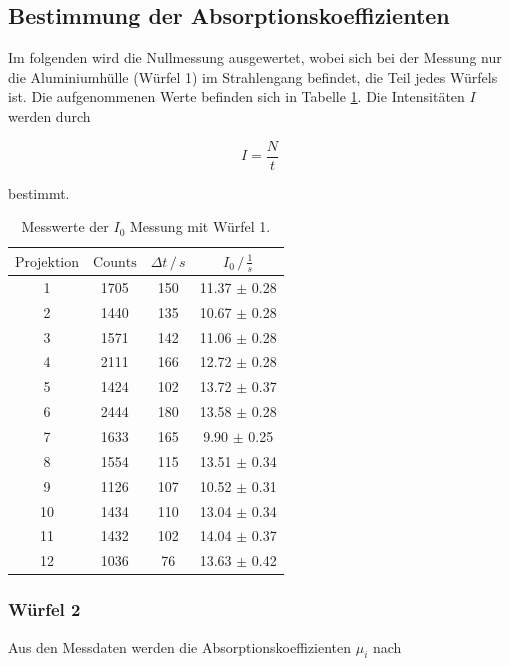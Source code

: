 \newpage
\subsection{Bestimmung der Absorptionskoeffizienten}
\noindent
Im folgenden wird die Nullmessung ausgewertet, wobei sich bei der Messung nur die Aluminiumhülle (Würfel 1) im Strahlengang befindet, die Teil jedes Würfels ist.
Die aufgenommenen Werte befinden sich in Tabelle \ref{tab:w1}.
Die Intensitäten $I$ werden durch

\begin{equation}
  I = \frac{N}{t}
\end{equation}

\noindent
bestimmt.

\begin{table}
  \centering
  \begin{tabular}{c c c c}
  \toprule
  $\text{Projektion}$ & $\text{Counts}$ & $\Delta t \,/\, s $ & $I_0 \,/\, \frac{1}{s} $\\
  \midrule 
    1  & 1705 & 150 & 11.37 $\pm$ 0.28 \\
    2  & 1440 & 135 & 10.67 $\pm$ 0.28 \\
    3  & 1571 & 142 & 11.06 $\pm$ 0.28 \\
    4  & 2111 & 166 & 12.72 $\pm$ 0.28 \\
    5  & 1424 & 102 & 13.72 $\pm$ 0.37 \\
    6  & 2444 & 180 & 13.58 $\pm$ 0.28 \\
    7  & 1633 & 165 & 9.90  $\pm$ 0.25 \\
    8  & 1554 & 115 & 13.51 $\pm$ 0.34 \\
    9  & 1126 & 107 & 10.52 $\pm$ 0.31 \\
    10 & 1434 & 110 & 13.04 $\pm$ 0.34 \\
    11 & 1432 & 102 & 14.04 $\pm$ 0.37 \\
    12 & 1036 &  76 & 13.63 $\pm$ 0.42 \\
  \bottomrule
  \end{tabular}
  \caption{Messwerte der $I_0$ Messung mit Würfel 1.}
  \label{tab:w1}
  \end{table}




\subsubsection{Würfel 2}

\noindent
Aus den Messdaten werden die Absorptionskoeffizienten $\mu_i$ nach 

